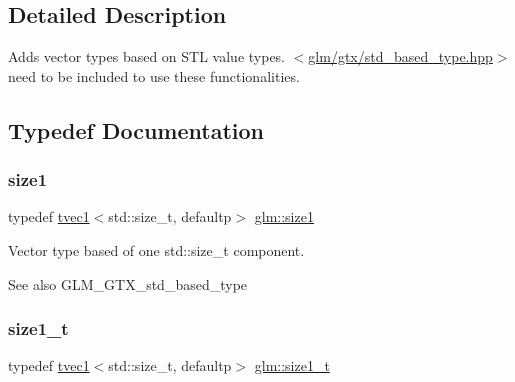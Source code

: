 \subsection{Detailed Description}
Adds vector types based on S\+TL value types. $<$\hyperlink{std__based__type_8hpp}{glm/gtx/std\+\_\+based\+\_\+type.\+hpp}$>$ need to be included to use these functionalities. 



\subsection{Typedef Documentation}
\mbox{\label{group__gtx__std__based__type_ga3550330d27cef40f7694130b501be73a}} 
\subsubsection{\texorpdfstring{size1}{size1}}
{\footnotesize\ttfamily typedef \hyperlink{structglm_1_1tvec1}{tvec1}$<$std\+::size\+\_\+t, defaultp$>$ \hyperlink{group__gtx__std__based__type_ga3550330d27cef40f7694130b501be73a}{glm\+::size1}}

Vector type based of one std\+::size\+\_\+t component. \begin{DoxySeeAlso}{See also}
G\+L\+M\+\_\+\+G\+T\+X\+\_\+std\+\_\+based\+\_\+type 
\end{DoxySeeAlso}
\mbox{\label{group__gtx__std__based__type_ga9a9525491009d0df7bcc964b1e2e5745}} 
\subsubsection{\texorpdfstring{size1\+\_\+t}{size1\_t}}
{\footnotesize\ttfamily typedef \hyperlink{structglm_1_1tvec1}{tvec1}$<$std\+::size\+\_\+t, defaultp$>$ \hyperlink{group__gtx__std__based__type_ga9a9525491009d0df7bcc964b1e2e5745}{glm\+::size1\+\_\+t}}

